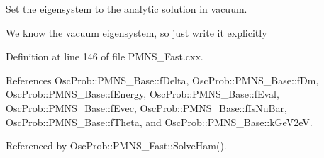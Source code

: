 Set the eigensystem to the analytic solution in vacuum.

We know the vacuum eigensystem, so just write it explicitly 

Definition at line 146 of file P\+M\+N\+S\+\_\+\+Fast.\+cxx.



References Osc\+Prob\+::\+P\+M\+N\+S\+\_\+\+Base\+::f\+Delta, Osc\+Prob\+::\+P\+M\+N\+S\+\_\+\+Base\+::f\+Dm, Osc\+Prob\+::\+P\+M\+N\+S\+\_\+\+Base\+::f\+Energy, Osc\+Prob\+::\+P\+M\+N\+S\+\_\+\+Base\+::f\+Eval, Osc\+Prob\+::\+P\+M\+N\+S\+\_\+\+Base\+::f\+Evec, Osc\+Prob\+::\+P\+M\+N\+S\+\_\+\+Base\+::f\+Is\+Nu\+Bar, Osc\+Prob\+::\+P\+M\+N\+S\+\_\+\+Base\+::f\+Theta, and Osc\+Prob\+::\+P\+M\+N\+S\+\_\+\+Base\+::k\+Ge\+V2eV.



Referenced by Osc\+Prob\+::\+P\+M\+N\+S\+\_\+\+Fast\+::\+Solve\+Ham().


